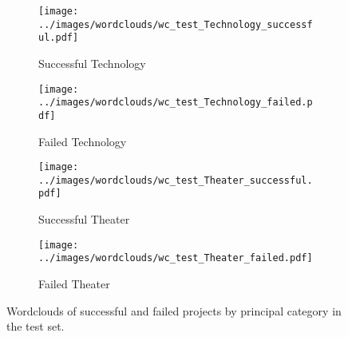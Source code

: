 \documentclass{article}
\begin{document}
\begin{figure}
\begin{subfigure}[n]{0.2\linewidth}
    \centering\texttt{[image: ../images/wordclouds/wc\_test\_Technology\_successful.pdf]}
    \caption{Successful Technology}
    \label{fig:Technology_s_test}
  \end{subfigure} 
  \begin{subfigure}[n']{0.2\linewidth}
    \centering\texttt{[image: ../images/wordclouds/wc\_test\_Technology\_failed.pdf]}
    \caption{Failed Technology}
    \label{fig:Technology_f_test}
  \end{subfigure}
    \begin{subfigure}[o]{0.2\linewidth}
    \centering\texttt{[image: ../images/wordclouds/wc\_test\_Theater\_successful.pdf]}
    \caption{Successful Theater}
    \label{fig:Theater_s_test}
  \end{subfigure} 
  \begin{subfigure}[o']{0.2\linewidth}
    \centering\texttt{[image: ../images/wordclouds/wc\_test\_Theater\_failed.pdf]}
    \caption{Failed Theater}
    \label{fig:Theater_f_test}
  \end{subfigure}

\caption{Wordclouds of successful and failed projects by principal category in the test set.}
\label{fig:wordclouds_test}
\end{figure}
\end{document}
